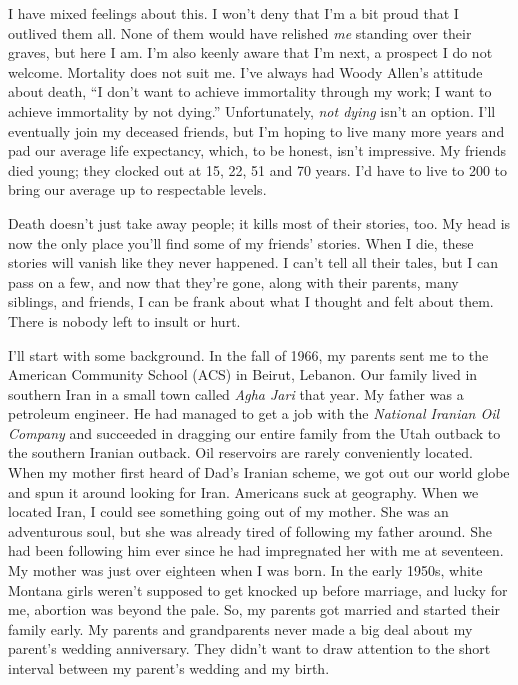 I have mixed feelings about this. I won't deny that I'm a bit proud that
I outlived them all. None of them would have relished \emph{me} standing
over their graves, but here I am. I'm also keenly aware that I'm next, a
prospect I do not welcome. Mortality does not suit me. I've always had
Woody Allen's attitude about death, ``I don't want to achieve
immortality through my work; I want to achieve immortality by not
dying.'' Unfortunately, \emph{not dying} isn't an option. I'll
eventually join my deceased friends, but I'm hoping to live many more
years and pad our average life expectancy, which, to be honest, isn't
impressive. My friends died young; they clocked out at 15, 22, 51 and 70
years. I'd have to live to 200 to bring our average up to respectable
levels.

Death doesn't just take away people; it kills most of their stories,
too. My head is now the only place you'll find some of my friends'
stories. When I die, these stories will vanish like they never happened.
I can't tell all their tales, but I can pass on a few, and now that
they're gone, along with their parents, many siblings, and friends, I
can be frank about what I thought and felt about them. There is nobody
left to insult or hurt.

I'll start with some background. In the fall of 1966, my parents sent me
to the American Community School (ACS) in Beirut, Lebanon. Our family
lived in southern Iran in a small town called \emph{Agha Jari} that
year. My father was a petroleum engineer. He had managed to get a job
with the \emph{National Iranian Oil Company} and succeeded in dragging
our entire family from the Utah outback to the southern Iranian outback.
Oil reservoirs are rarely conveniently located. When my mother first
heard of Dad's Iranian scheme, we got out our world globe and spun it
around looking for Iran. Americans suck at geography. When we located
Iran, I could see something going out of my mother. She was an
adventurous soul, but she was already tired of following my father
around. She had been following him ever since he had impregnated her
with me at seventeen. My mother was just over eighteen when I was born.
In the early 1950s, white Montana girls weren't supposed to get knocked
up before marriage, and lucky for me, abortion was beyond the pale. So,
my parents got married and started their family early. My parents and
grandparents never made a big deal about my parent's wedding
anniversary. They didn't want to draw attention to the short interval
between my parent's wedding and my birth.

